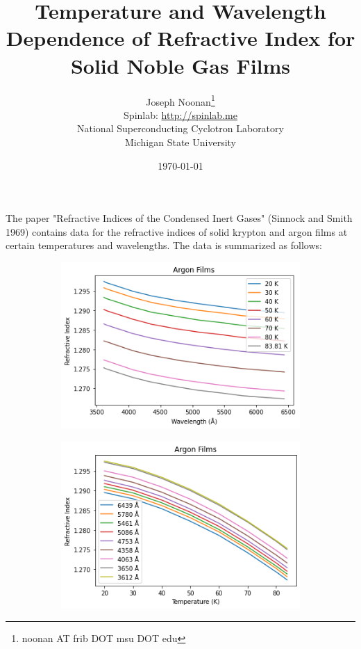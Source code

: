 \documentclass[letterpaper,12pt]{article}
\title{Temperature and Wavelength Dependence of Refractive Index for Solid Noble Gas Films}
\author{Joseph Noonan\footnote{noonan AT frib DOT msu DOT edu}\\ Spinlab: \href{https://spinlab.me}{http://spinlab.me} \\ National Superconducting Cyclotron Laboratory\\ Michigan State University}
\date{\today}
\begin{document}
\maketitle

The paper "Refractive Indices of the Condensed Inert Gases" (Sinnock and Smith 1969) contains data for the refractive indices of solid krypton and argon films at certain temperatures and wavelengths. The data is summarized as follows:
\begin{figure}[h!]
	\begin{subfigure}[b]{0.5\linewidth}
		\centering
		\includegraphics[width=\textwidth,height=\textheight,keepaspectratio]{argon1.png}
	\end{subfigure}
	\begin{subfigure}[b]{0.5\linewidth}
		\centering
		\includegraphics[width=\textwidth,height=\textheight,keepaspectratio]{argon2.png}

\end{subfigure}
\end{figure}
\end{document}

